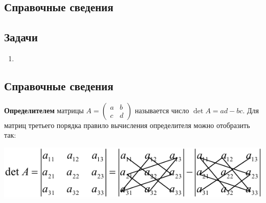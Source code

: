 \setcounter{chapter}{72}

\subsection*{Справочные сведения}



\subsection*{Задачи}

\begin{enumerate}
\item 


\end{enumerate}





\setcounter{chapter}{74}

\subsection*{Справочные сведения}

\textbf{Определителем} матрицы $A=\begin{pmatrix} a & b \\ c & d \end{pmatrix}$ называется число $\det A=ad-bc$. Для матриц третьего порядка правило вычисления определителя можно отобразить так:
\begin{center}
\includegraphics[scale=0.7]{det.png}
\end{center}

